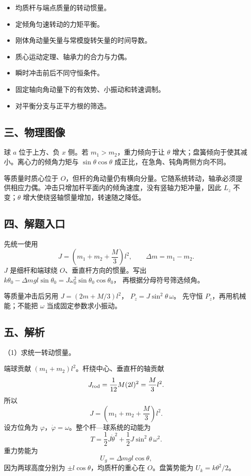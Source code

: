 \documentclass[12pt,a4paper,fontset=fandol]{ctexart}
\providecommand{\tightlist}{\setlength{\itemsep}{0pt}\setlength{\parskip}{0pt}}
\begin{document}
\begin{itemize}
\tightlist
\item
  均质杆与端点质量的转动惯量。
\item
  定倾角匀速转动的力矩平衡。
\item
  刚体角动量矢量与常模旋转矢量的时间导数。
\item
  质心运动定理、轴承力的合力与力偶。
\item
  瞬时冲击前后不同守恒条件。
\item
  固定轴向角动量下的有效势、小振动和转速调制。
\item
  对平衡分支与正平方根的筛选。
\end{itemize}

\subsection{三、物理图像}\label{ux4e09ux7269ux7406ux56feux50cf-5}

球 \(a\) 位于上方、负 \(x\) 侧。若 \(m_1>m_2\)，重力倾向于让 \(\theta\)
增大；盘簧倾向于使其减小。离心力的倾角力矩与 \(\sin\theta\cos\theta\)
成正比，在急角、钝角两侧方向不同。

等质量时质心位于
\(O\)，但杆的角动量仍有横向分量。它随系统转动，轴承必须提供相应力偶。冲击只增加杆平面内的倾角速度，没有竖轴力矩冲量，因此
\(L_z\) 不变；\(\theta\) 增大使绕竖轴惯量增加，转速随之降低。

\subsection{四、解题入口}\label{ux56dbux89e3ux9898ux5165ux53e3-5}

先统一使用 \[
J=\left(m_1+m_2+\frac M3\right)l^2,\qquad
\Delta m=m_1-m_2.
\] \(J\) 是细杆和端球绕 \(O\)、垂直杆方向的惯量。写出
\(k\theta_0-\Delta mgl\sin\theta_0
=J\omega_0^2\sin\theta_0\cos\theta_0\)， 再根据分母符号筛选倾角。

等质量冲击后另用 \(J=(2m+M/3)l^2\)， \(P_z=J\sin^2\theta\,\omega\)。
先守恒 \(P_z\)，再用机械能；不能把 \(\omega\) 当成固定参数求小振动。

\subsection{五、解析}\label{ux4e94ux89e3ux6790-5}

（1）求统一转动惯量。

端球贡献 \((m_1+m_2)l^2\)。杆绕中心、垂直杆的轴贡献 \[
J_{\rm rod}=\frac1{12}M(2l)^2=\frac M3l^2.
\] 所以 \[
\boxed{J=\left(m_1+m_2+\frac M3\right)l^2.}\tag{6.1}
\] 设方位角为
\(\varphi\)，\(\dot\varphi=\omega\)。整个杆---球系统的动能为 \[
T=\frac12J\dot\theta^2+\frac12J\sin^2\theta\,\omega^2.
\] 重力势能为 \[
U_g=\Delta mgl\cos\theta,
\] 因为两球高度分别为 \(\pm l\cos\theta\)，均质杆的重心在
\(O\)。盘簧势能为 \(U_k=k\theta^2/2\)。
\end{document}
